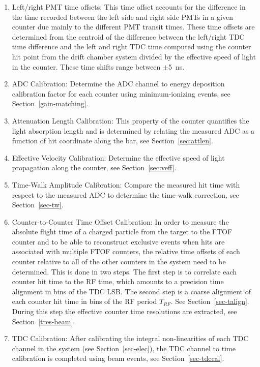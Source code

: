 \documentclass{elsart}
\begin{document}
\begin{enumerate}
\item Left/right PMT time offsets: This time offset accounts for the difference in the time recorded
between the left side and right side PMTs in a given counter due mainly to the different PMT transit times.
These time offsets are determined from the centroid of the difference between the left/right TDC time
difference and the left and right TDC time computed using the counter hit point from the drift chamber
system divided by the effective speed of light in the counter. These time shifts range between $\pm$5~ns.

\item ADC Calibration: Determine the ADC channel to energy deposition calibration factor for each counter
using minimum-ionizing events, see Section~\ref{gain-matching}.

\item Attenuation Length Calibration: This property of the counter quantifies the light absorption length and
is determined by relating the measured ADC as a function of hit coordinate along the bar, see
Section~\ref{sec:attlen}.

\item Effective Velocity Calibration: Determine the effective speed of light propagation along the counter,
see Section~\ref{sec:veff}.

\item Time-Walk Amplitude Calibration: Compare the measured hit time with respect to the measured ADC
to determine the time-walk correction, see Section~\ref{sec-tw}.
  
\item Counter-to-Counter Time Offset Calibration: In order to measure the absolute flight time of a charged
particle from the target to the FTOF counter and to be able to reconstruct exclusive events when hits are
associated with multiple FTOF counters, the relative time offsets of each counter relative to all of the other
counters in the system need to be determined. This is done in two steps. The first step is to correlate each
counter hit time to the RF time, which amounts to a precision time alignment in bins of the TDC LSB. The
second step is a coarse alignment of each counter hit time in bins of the RF period $T_{RF}$. See
Section~\ref{sec-talign}. During this step the effective counter time resolutions are extracted, see
Section~\ref{tres-beam}.

\item TDC Calibration: After calibrating the integral non-linearities of each TDC channel in the system (see
Section~\ref{sec-elec}), the TDC channel to time calibration is completed using beam events, see
Section~\ref{sec-tdccal}.

\end{enumerate}
\end{document}
